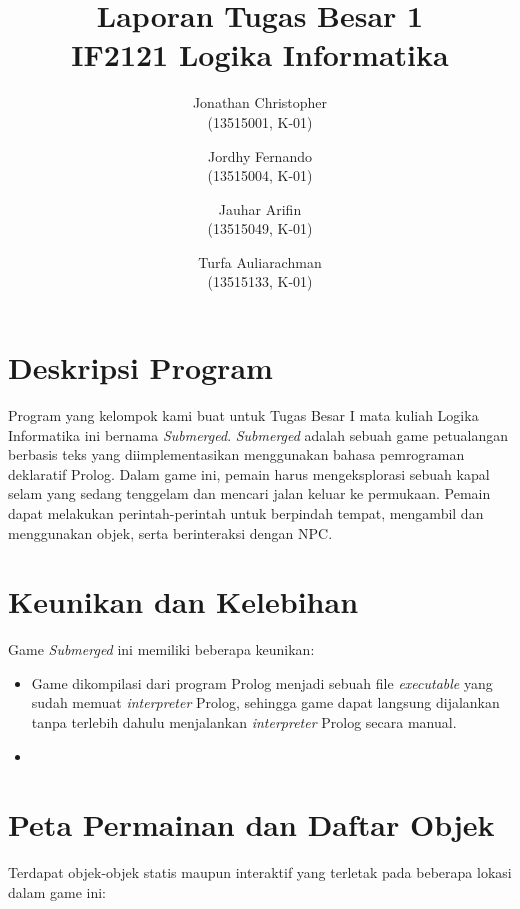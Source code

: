 \documentclass[a4paper,titlepage]{article}
\begin{document}
	\title{Laporan Tugas Besar 1 \\ IF2121 Logika Informatika}
	\author{
			Jonathan Christopher \\
			(13515001, K-01)
		\and
			Jordhy Fernando \\
			(13515004, K-01)
		\and
			Jauhar Arifin \\
			(13515049, K-01)
		\and
			Turfa Auliarachman \\
			(13515133, K-01)
	}
	\maketitle

	\section{Deskripsi Program}

		Program yang kelompok kami buat untuk Tugas Besar I mata kuliah Logika Informatika ini bernama \textit{Submerged}. \textit{Submerged} adalah sebuah game petualangan berbasis teks yang diimplementasikan menggunakan bahasa pemrograman deklaratif Prolog. Dalam game ini, pemain harus mengeksplorasi sebuah kapal selam yang sedang tenggelam dan mencari jalan keluar ke permukaan. Pemain dapat melakukan perintah-perintah untuk berpindah tempat, mengambil dan menggunakan objek, serta berinteraksi dengan NPC.

	\section{Keunikan dan Kelebihan}

		Game \textit{Submerged} ini memiliki beberapa keunikan:

		\begin{itemize}
			\item Game dikompilasi dari program Prolog menjadi sebuah file \textit{executable} yang sudah memuat \textit{interpreter} Prolog, sehingga game dapat langsung dijalankan tanpa terlebih dahulu menjalankan \textit{interpreter} Prolog secara manual.
			\item
		\end{itemize}

	\section{Peta Permainan dan Daftar Objek}

		\noindent Terdapat objek-objek statis maupun interaktif yang terletak pada beberapa lokasi dalam game ini:
\end{document}
